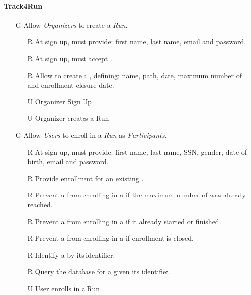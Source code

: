 \documentclass[../../../rasd.tex]{subfiles}
\begin{document}
\paragraph{Track4Run}
\begin{itemize}
	\item[G\subs{8}]Allow \textit{Organizers} to create a \textit{Run}.
	\begin{itemize}
		\item[R\subs{41}]At sign up,  must provide: first name, last name, email and password.
		\item[R\subs{42}]At sign up,  must accept .
		\item[R\subs{43}]Allow  to create a , defining: name, path, date, maximum number of  and enrollment closure date. 
		\\
		\item[U\subs{13}]Organizer Sign Up  
		\item[U\subs{14}]Organizer creates a Run
	\end{itemize}

	\item[G\subs{9}]Allow \textit{Users} to enroll in a \textit{Run} as \textit{Participants}. 
	\begin{itemize}
		\item[R\subs{2}]At sign up,  must provide: first name, last name, SSN, gender, date of birth, email and password.
		\item[R\subs{44}]Provide  enrollment for an existing .
		\item[R\subs{45}]Prevent a  from enrolling in a  if the maximum number of  was already reached.
		\item[R\subs{46}]Prevent a  from enrolling in a  if it already started or finished.
		\item[R\subs{47}]Prevent a  from enrolling in a  if enrollment is closed.
		\item[R\subs{49}]Identify a  by its identifier.
		\item[R\subs{50}]Query the database for a  given its identifier.
		\\
		\item[U\subs{15}]User enrolls in a Run
	\end{itemize}


\end{itemize}
\end{document}
